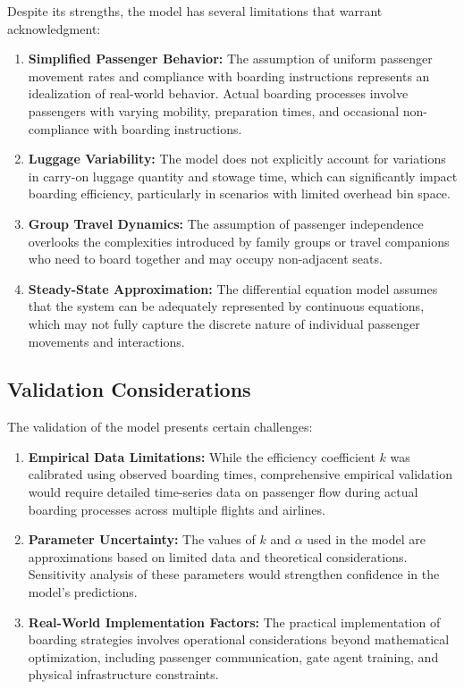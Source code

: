 Despite its strengths, the model has several limitations that warrant acknowledgment:

\begin{enumerate}
    \item \textbf{Simplified Passenger Behavior:} The assumption of uniform passenger movement rates and compliance with boarding instructions represents an idealization of real-world behavior. Actual boarding processes involve passengers with varying mobility, preparation times, and occasional non-compliance with boarding instructions.
    
    \item \textbf{Luggage Variability:} The model does not explicitly account for variations in carry-on luggage quantity and stowage time, which can significantly impact boarding efficiency, particularly in scenarios with limited overhead bin space.
    
    \item \textbf{Group Travel Dynamics:} The assumption of passenger independence overlooks the complexities introduced by family groups or travel companions who need to board together and may occupy non-adjacent seats.
    
    \item \textbf{Steady-State Approximation:} The differential equation model assumes that the system can be adequately represented by continuous equations, which may not fully capture the discrete nature of individual passenger movements and interactions.
\end{enumerate}

\subsection{Validation Considerations}

The validation of the model presents certain challenges:

\begin{enumerate}
    \item \textbf{Empirical Data Limitations:} While the efficiency coefficient $k$ was calibrated using observed boarding times, comprehensive empirical validation would require detailed time-series data on passenger flow during actual boarding processes across multiple flights and airlines.
    
    \item \textbf{Parameter Uncertainty:} The values of $k$ and $\alpha$ used in the model are approximations based on limited data and theoretical considerations. Sensitivity analysis of these parameters would strengthen confidence in the model's predictions.
    
    \item \textbf{Real-World Implementation Factors:} The practical implementation of boarding strategies involves operational considerations beyond mathematical optimization, including passenger communication, gate agent training, and physical infrastructure constraints.
\end{enumerate}

